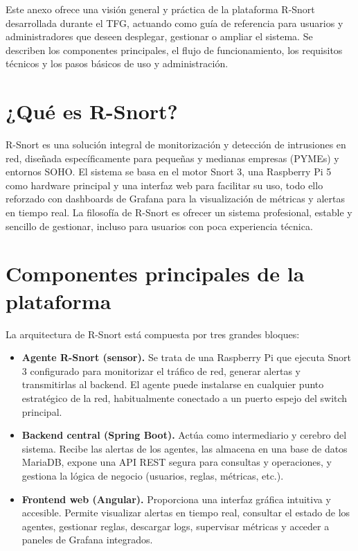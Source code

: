\documentclass[11pt,a4paper,twoside]{report}
\newcounter{anexo}
\begin{document}
Este anexo ofrece una visión general y práctica de la plataforma R-Snort desarrollada durante el TFG, actuando como guía de referencia para usuarios y administradores que deseen desplegar, gestionar o ampliar el sistema. Se describen los componentes principales, el flujo de funcionamiento, los requisitos técnicos y los pasos básicos de uso y administración.

\section{¿Qué es R-Snort?}

R-Snort es una solución integral de monitorización y detección de intrusiones en red, diseñada específicamente para pequeñas y medianas empresas (PYMEs) y entornos SOHO. El sistema se basa en el motor Snort 3, una Raspberry Pi 5 como hardware principal y una interfaz web para facilitar su uso, todo ello reforzado con dashboards de Grafana para la visualización de métricas y alertas en tiempo real. La filosofía de R-Snort es ofrecer un sistema profesional, estable y sencillo de gestionar, incluso para usuarios con poca experiencia técnica.

\section{Componentes principales de la plataforma}

La arquitectura de R-Snort está compuesta por tres grandes bloques:

\begin{itemize}
	\item \textbf{Agente R-Snort (sensor).} Se trata de una Raspberry Pi que ejecuta Snort 3 configurado para monitorizar el tráfico de red, generar alertas y transmitirlas al backend. El agente puede instalarse en cualquier punto estratégico de la red, habitualmente conectado a un puerto espejo del switch principal.
	\item \textbf{Backend central (Spring Boot).} Actúa como intermediario y cerebro del sistema. Recibe las alertas de los agentes, las almacena en una base de datos MariaDB, expone una API REST segura para consultas y operaciones, y gestiona la lógica de negocio (usuarios, reglas, métricas, etc.).
	\item \textbf{Frontend web (Angular).} Proporciona una interfaz gráfica intuitiva y accesible. Permite visualizar alertas en tiempo real, consultar el estado de los agentes, gestionar reglas, descargar logs, supervisar métricas y acceder a paneles de Grafana integrados.
\end{itemize}
\end{document}
